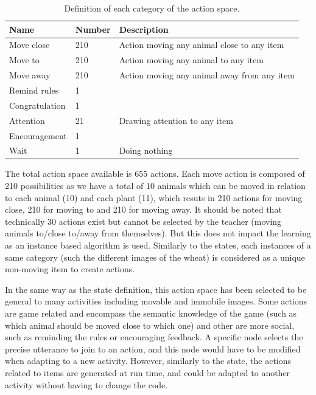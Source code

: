 \begin{table}[ht]
	\centering
	\caption{Definition of each category of the action space.}
	\label{tab:tuto_actions_space}
	\begin{tabularx}{\textwidth}{@{}llX@{}}\toprule
		Name & Number & Description \\
		\midrule
		Move close & 210 &  Action moving any animal close to any item\\
		Move to & 210 & Action moving any animal to any item\\
		Move away & 210 & Action moving any animal away from any item\\
		Remind rules & 1 & \\
		Congratulation & 1 & \\
		Attention & 21 & Drawing attention to any item\\
		Encouragement & 1 & \\
		Wait & 1 & Doing nothing\\
		\bottomrule
	\end{tabularx}
\end{table}

The total action space available is 655 actions. Each move action is composed of 210 possibilities as we have a total of 10 animals which can be moved in relation to each animal (10) and each plant (11), which resuts in 210 actions for moving close, 210 for moving to and 210 for moving away. It should be noted that technically 30 actions exist but cannot be selected by the teacher (moving animals to/close to/away from themselves). But this does not impact the learning as an instance based algorithm is used. Similarly to the states, each instances of a same category (such the different images of the wheat) is considered as a unique non-moving item to create actions.

In the same way as the state definition, this action space has been selected to be general to many activities including movable and immobile images. Some actions are game related and encompass the semantic knowledge of the game (such as which animal should be moved close to which one) and other are more social, such as reminding the rules or encouraging feedback. A specific node selects the precise utterance to join to an action, and this node would have to be modified when adapting to a new activity. However, similarly to the state, the actions related to items are generated at run time, and could be adapted to another activity without having to change the code. 

